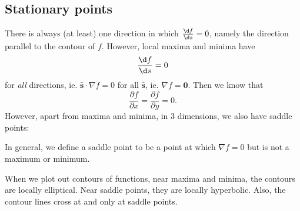 \documentclass[a4paper]{article}
\begin{document}
\subsection{Stationary points}
There is always (at least) one direction in which $\frac{\d f}{\d s} = 0$, namely the direction parallel to the contour of $f$. However, local maxima and minima have
\[
  \frac{\d f}{\d s} = 0
\]
for \emph{all} directions, ie. $\mathbf{\hat{s}}\cdot \nabla f = 0$ for all $\mathbf{\hat{s}}$, ie. $\nabla f = \mathbf{0}$. Then we know that
\[
  \frac{\partial f}{\partial x} = \frac{\partial f}{\partial y} = 0.
\]
However, apart from maxima and minima, in 3 dimensions, we also have saddle points:
\begin{center}
\end{center}
In general, we define a saddle point to be a point at which $\nabla f = 0$ but is not a maximum or minimum.

When we plot out contours of functions, near maxima and minima, the contours are locally elliptical. Near saddle points, they are locally hyperbolic. Also, the contour lines cross at and only at saddle points.
\end{document}
